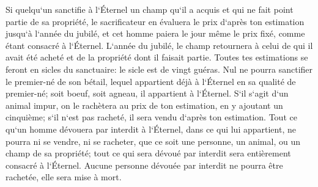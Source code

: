 \verse Si quelqu`un sanctifie à l`Éternel un champ qu`il a acquis et qui ne fait point partie de sa propriété, 
\verse le sacrificateur en évaluera le prix d`après ton estimation jusqu`à l`année du jubilé, et cet homme paiera le jour même le prix fixé, comme étant consacré à l`Éternel. 
\verse L`année du jubilé, le champ retournera à celui de qui il avait été acheté et de la propriété dont il faisait partie. 
\verse Toutes tes estimations se feront en sicles du sanctuaire: le sicle est de vingt guéras. 
\verse Nul ne pourra sanctifier le premier-né de son bétail, lequel appartient déjà à l`Éternel en sa qualité de premier-né; soit boeuf, soit agneau, il appartient à l`Éternel. 
\verse S`il s`agit d`un animal impur, on le rachètera au prix de ton estimation, en y ajoutant un cinquième; s`il n`est pas racheté, il sera vendu d`après ton estimation. 
\verse Tout ce qu`un homme dévouera par interdit à l`Éternel, dans ce qui lui appartient, ne pourra ni se vendre, ni se racheter, que ce soit une personne, un animal, ou un champ de sa propriété; tout ce qui sera dévoué par interdit sera entièrement consacré à l`Éternel. 
\verse Aucune personne dévouée par interdit ne pourra être rachetée, elle sera mise à mort. 
